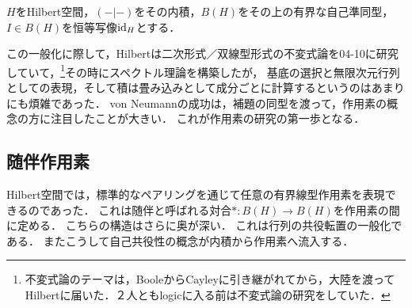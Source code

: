 \documentclass[uplatex,dvipdfmx]{jsreport}
\begin{document}
\begin{notation}
    $H$をHilbert空間，$(-|-)$をその内積，$B(H)$をその上の有界な自己準同型，$I\in B(H)$を恒等写像$\mathrm{id}_H$とする．
\end{notation}

\begin{history}
    この一般化に際して，Hilbertは二次形式／双線型形式の不変式論を04-10に研究していて，\footnote{不変式論のテーマは，BooleからCayleyに引き継がれてから，大陸を渡ってHilbertに届いた．２人ともlogicに入る前は不変式論の研究をしていた．}その時にスペクトル理論を構築したが，
    基底の選択と無限次元行列としての表現，そして積は畳み込みとして成分ごとに計算するというのはあまりにも煩雑であった．
    von Neumannの成功は，補題の同型を渡って，作用素の概念の方に注目したことが大きい．
    これが作用素の研究の第一歩となる．
\end{history}

\subsection{随伴作用素}

\begin{tcolorbox}[colframe=ForestGreen, colback=ForestGreen!10!white,breakable,colbacktitle=ForestGreen!40!white,coltitle=black,fonttitle=\bfseries\sffamily,
title=]
    Hilbert空間では，標準的なペアリングを通じて任意の有界線型作用素を表現できるのであった．
    これは随伴と呼ばれる対合$*:B(H)\to B(H)$を作用素の間に定める．
    こちらの構造はさらに奥が深い．
    これは行列の共役転置の一般化である．
    またこうして自己共役性の概念が内積から作用素へ流入する．
\end{tcolorbox}
\end{document}
